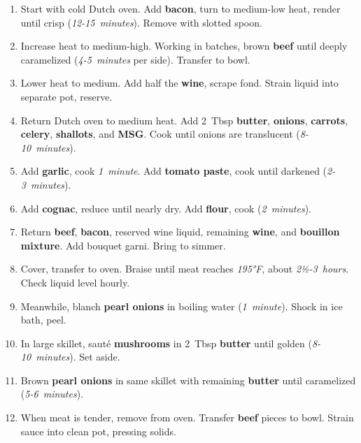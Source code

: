 \documentclass[11pt,letterpaper]{article}
\begin{document}
\begin{enumerate}
    \item Start with cold Dutch oven. Add \textbf{bacon}, turn to medium-low heat, render until crisp (\textit{12-15~minutes}). Remove with slotted spoon.
    
    \item Increase heat to medium-high. Working in batches, brown \textbf{beef} until deeply caramelized (\textit{4-5~minutes} per side). Transfer to bowl.
    
    \item Lower heat to medium. Add half the \textbf{wine}, scrape fond. Strain liquid into separate pot, reserve.
    
    \item Return Dutch oven to medium heat. Add 2~Tbsp \textbf{butter}, \textbf{onions}, \textbf{carrots}, \textbf{celery}, \textbf{shallots}, and \textbf{MSG}. Cook until onions are translucent (\textit{8-10~minutes}).
    
    \item Add \textbf{garlic}, cook \textit{1~minute}. Add \textbf{tomato paste}, cook until darkened (\textit{2-3~minutes}).
    
    \item Add \textbf{cognac}, reduce until nearly dry. Add \textbf{flour}, cook (\textit{2~minutes}).
    
    \item Return \textbf{beef}, \textbf{bacon}, reserved wine liquid, remaining \textbf{wine}, and \textbf{bouillon mixture}. Add bouquet garni. Bring to simmer.
    
    \item Cover, transfer to oven. Braise until meat reaches \textit{195°F}, about \textit{2½-3~hours}. Check liquid level hourly.
    
    \item Meanwhile, blanch \textbf{pearl onions} in boiling water (\textit{1~minute}). Shock in ice bath, peel.
    
    \item In large skillet, sauté \textbf{mushrooms} in 2~Tbsp \textbf{butter} until golden (\textit{8-10~minutes}). Set aside.
    
    \item Brown \textbf{pearl onions} in same skillet with remaining \textbf{butter} until caramelized (\textit{5-6~minutes}).
    
    \item When meat is tender, remove from oven. Transfer \textbf{beef} pieces to bowl. Strain sauce into clean pot, pressing solids.
    

\end{enumerate}
\end{document}
